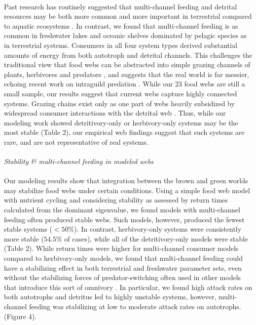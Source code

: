 \documentclass[12pt,a4paper,oneside]{article}
\begin{document}
\\
\indent 
Past research has routinely suggested that multi-channel feeding and detrital
resources may be both more common and more important in
terrestrial compared to aquatic ecosystems \citep{Polis:1996}.  In
contrast, we found that multi-channel feeding is as common in
freshwater lakes and oceanic shelves dominated by pelagic species as
in terrestrial systems. Consumers in all four system types derived substantial amounts of energy from both autotroph
and detrital channels. This challenges the traditional view that food
webs can be abstracted into simple grazing channels of plants,
herbivores and predators \citep{Holt:2006,  Pimm:1982}, and
suggests that the real world is far messier, echoing recent work on 
intraguild predation \citep{Rudolf:2007,miller2011}. While
our 23 food webs are still a small sample, our results
suggest that current webs capture highly connected systems. Grazing
chains exist only as one part of webs heavily subsidized by widespread
consumer interactions with the detrital web \citep{Moore:2004}. Thus, while our modeling work showed detritivory-only or herbivory-only systems may be the most stable (Table 2), our empirical web findings suggest that such systems are rare, and are not representative of real systems.
\\
\\
\noindent \emph{Stability \& multi-channel feeding in modeled webs}\\
\\
\indent Our modeling results show that integration between the brown and
green worlds may stabilize food webs under certain conditions. 
Using a simple food web model with nutrient cycling and considering stability as assessed by return times calculated from the
dominant eigenvalue, we found models with multi-channel feeding often produced
stable webs. Such models, however, produced the fewest stable systems (\(<50\%\)). In contrast, herbivory-only systems were consistently more stable (\(54.5\%\) of cases), while all of the detritivory-only models were stable (Table 2). While return times were higher for multi-channel consumer models compared to herbivory-only models, we found that multi-channel feeding could have a stabilizing effect in both terrestrial and freshwater parameter sets, even without the stabilizing forces of
predator-switching often used in other models that introduce this sort of omnivory
\citep{Rooney:2006}. In particular, we found high attack rates on
both autotrophs and detritus led to highly unstable systems, however, multi-channel feeding was stabilizing at low to moderate attack rates on autotrophs.(Figure 4).
\end{document}
